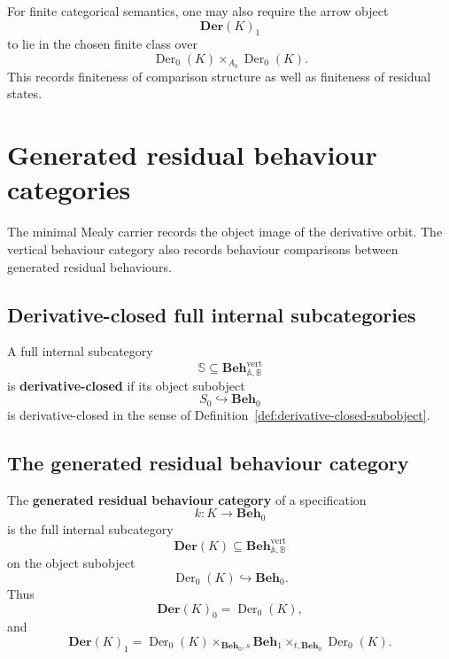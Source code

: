 \begin{remark}
\label{rem:finite-arrow-object}
    For finite categorical semantics, one may also require the arrow object
    \[
        \mathbf{Der}(K)_1
    \]
    to lie in the chosen finite class over
    \[
        \operatorname{Der}_0(K)\times_{A_0}\operatorname{Der}_0(K).
    \]
    This records finiteness of comparison structure as well as finiteness of residual states.
\end{remark}

\section{Generated residual behaviour categories}
\label{sec:generated-residual-behaviour-categories}

The minimal Mealy carrier records the object image of the derivative orbit. The vertical behaviour category also records behaviour comparisons between generated residual behaviours.

\subsection{Derivative-closed full internal subcategories}
\label{subsec:derivative-closed-full-internal-subcategories}

\begin{definition}
\label{def:derivative-closed-full-subcategory}
    A full internal subcategory
    \[
        \mathbb S\subseteq
        \mathbf{Beh}^{\mathrm{vert}}_{\mathbb A,\mathbb B}
    \]
    is \textbf{derivative-closed} if its object subobject
    \[
        S_0\hookrightarrow\mathbf{Beh}_0
    \]
    is derivative-closed in the sense of Definition~\ref{def:derivative-closed-subobject}.
\end{definition}

\subsection{The generated residual behaviour category}
\label{subsec:generated-residual-behaviour-category}

\begin{definition}
\label{def:generated-residual-behaviour-category}
    The \textbf{generated residual behaviour category} of a specification
    \[
        k:K\to\mathbf{Beh}_0
    \]
    is the full internal subcategory
    \[
        \mathbf{Der}(K)
        \subseteq
        \mathbf{Beh}^{\mathrm{vert}}_{\mathbb A,\mathbb B}
    \]
    on the object subobject
    \[
        \operatorname{Der}_0(K)\hookrightarrow\mathbf{Beh}_0.
    \]
    Thus
    \[
        \mathbf{Der}(K)_0=\operatorname{Der}_0(K),
    \]
    and
    \[
        \mathbf{Der}(K)_1
        =
        \operatorname{Der}_0(K)
        \times_{\mathbf{Beh}_0,s}
        \mathbf{Beh}_1
        \times_{t,\mathbf{Beh}_0}
        \operatorname{Der}_0(K).
    \]
\end{definition}

